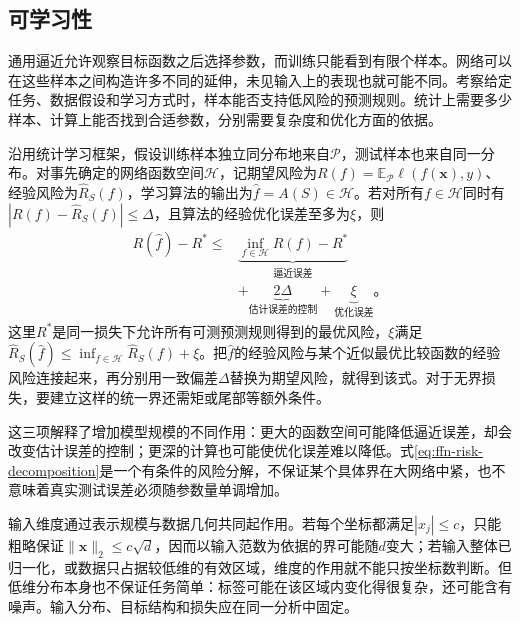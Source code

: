 \subsection{可学习性}
\label{sec:ffn-learnability}

通用逼近允许观察目标函数之后选择参数，而训练只能看到有限个样本。网络可以在这些样本之间构造许多不同的延伸，未见输入上的表现也就可能不同。考察给定任务、数据假设和学习方式时，样本能否支持低风险的预测规则。统计上需要多少样本、计算上能否找到合适参数，分别需要复杂度和优化方面的依据。

沿用统计学习框架，假设训练样本独立同分布地来自$\mathcal{P}$，测试样本也来自同一分布。对事先确定的网络函数空间$\mathcal{H}$，记期望风险为$R(f)=\mathbb{E}_{\mathcal{P}}\ell(f(\bm{x}),y)$、经验风险为$\widehat R_S(f)$，学习算法的输出为$\widehat f=A(S)\in\mathcal{H}$。若对所有$f\in\mathcal{H}$同时有$|R(f)-\widehat R_S(f)|\leq\Delta$，且算法的经验优化误差至多为$\xi$，则
\begin{equation}
  \begin{aligned}
    R(\widehat f)-R^*\leq{}&
    \underbrace{\inf_{f\in\mathcal{H}}R(f)-R^*}_{\text{逼近误差}}\\
    &+\underbrace{2\Delta}_{\text{估计误差的控制}}
    +\underbrace{\xi}_{\text{优化误差}}\text{。}
  \end{aligned}
  \label{eq:ffn-risk-decomposition}
\end{equation}
这里$R^*$是同一损失下允许所有可测预测规则得到的最优风险，$\xi$满足$\widehat R_S(\widehat f)\leq\inf_{f\in\mathcal{H}}\widehat R_S(f)+\xi$。把$\widehat f$的经验风险与某个近似最优比较函数的经验风险连接起来，再分别用一致偏差$\Delta$替换为期望风险，就得到该式。对于无界损失，要建立这样的统一界还需矩或尾部等额外条件。

这三项解释了增加模型规模的不同作用：更大的函数空间可能降低逼近误差，却会改变估计误差的控制；更深的计算也可能使优化误差难以降低。式\eqref{eq:ffn-risk-decomposition}是一个有条件的风险分解，不保证某个具体界在大网络中紧，也不意味着真实测试误差必须随参数量单调增加。

输入维度通过表示规模与数据几何共同起作用。若每个坐标都满足$|x_j|\leq c$，只能粗略保证$\lVert\bm{x}\rVert_2\leq c\sqrt d$，因而以输入范数为依据的界可能随$d$变大；若输入整体已归一化，或数据只占据较低维的有效区域，维度的作用就不能只按坐标数判断。但低维分布本身也不保证任务简单：标签可能在该区域内变化得很复杂，还可能含有噪声。输入分布、目标结构和损失应在同一分析中固定。

